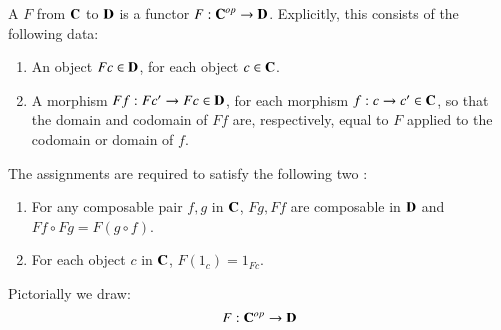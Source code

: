\begin{definition}
    A  $F$ from $\normalfont\textbf{C}$ to $\normalfont\textbf{D}$ is a functor $F:\normalfont\textbf{C}^{op}\rightarrow \normalfont\textbf{D}$. Explicitly, this consists of the following data: \begin{enumerate}
        \item An object $Fc \in \normalfont\textbf{D}$, for each object $c \in \normalfont\textbf{C}$.
        \item A morphism $Ff:Fc'\rightarrow Fc\in \normalfont\textbf{D}$, for each morphism $f:c\rightarrow c' \in \normalfont\textbf{C}$, so that the domain and codomain of $Ff$ are, respectively, equal to $F$ applied to the codomain or domain of $f$.
    \end{enumerate}
    The assignments are required to satisfy the following two : \begin{enumerate}
        \item For any composable pair $f,g$ in $\normalfont\textbf{C}$, $Fg,Ff$ are composable in $\normalfont\textbf{D}$ and $Ff\circ Fg = F(g\circ f)$.
        \item For each object $c$ in $\normalfont\textbf{C}$, $F(1_c) = 1_{Fc}$.
    \end{enumerate}
    Pictorially we draw:
    \begin{equation*}
        F:\normalfont\textbf{C}^{op}\rightarrow \normalfont\textbf{D}
    \end{equation*}
    \begin{center}
    \end{center}
\end{definition}


